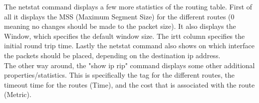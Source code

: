 


The netstat command displays a few more statistics of the routing table. First of all it displays the MSS (Maximum Segment Size) for the different routes (0 meaning no changes should be made to the packet size). It also displays the Window, which specifies the default window size. The irtt column specifies the initial round trip time. Lastly the netstat command also shows on which interface the packets should be placed, depending on the destination ip address. \\

The other way around, the "show ip rip" command displays some other additional properties/statistics. This is specifically the tag for the different routes, the timeout time for the routes (Time), and the cost that is associated with the route (Metric).